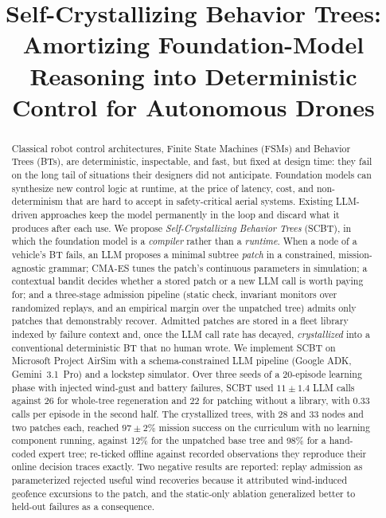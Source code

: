 \documentclass[conference]{IEEEtran}
\begin{document}
\title{Self-Crystallizing Behavior Trees: Amortizing Foundation-Model Reasoning into Deterministic Control for Autonomous Drones}

\author{}

\maketitle
\thispagestyle{plain}
\pagestyle{plain}

\begin{abstract}
Classical robot control architectures, Finite State Machines (FSMs) and Behavior Trees (BTs), are deterministic, inspectable, and fast, but fixed at design time: they fail on the long tail of situations their designers did not anticipate. Foundation models can synthesize new control logic at runtime, at the price of latency, cost, and non-determinism that are hard to accept in safety-critical aerial systems. Existing LLM-driven approaches keep the model permanently in the loop and discard what it produces after each use. We propose \emph{Self-Crystallizing Behavior Trees} (SCBT), in which the foundation model is a \emph{compiler} rather than a \emph{runtime}. When a node of a vehicle's BT fails, an LLM proposes a minimal subtree \emph{patch} in a constrained, mission-agnostic grammar; CMA-ES tunes the patch's continuous parameters in simulation; a contextual bandit decides whether a stored patch or a new LLM call is worth paying for; and a three-stage admission pipeline (static check, invariant monitors over randomized replays, and an empirical margin over the unpatched tree) admits only patches that demonstrably recover. Admitted patches are stored in a fleet library indexed by failure context and, once the LLM call rate has decayed, \emph{crystallized} into a conventional deterministic BT that no human wrote. We implement SCBT on Microsoft Project AirSim with a schema-constrained LLM pipeline (Google ADK, Gemini~3.1~Pro) and a lockstep simulator. Over three seeds of a 20-episode learning phase with injected wind-gust and battery failures, SCBT used $11\pm1.4$ LLM calls against 26 for whole-tree regeneration and 22 for patching without a library, with 0.33 calls per episode in the second half. The crystallized trees, with 28 and 33 nodes and two patches each, reached $97\pm2\%$ mission success on the curriculum with no learning component running, against 12\% for the unpatched base tree and 98\% for a hand-coded expert tree; re-ticked offline against recorded observations they reproduce their online decision traces exactly. Two negative results are reported: replay admission as parameterized rejected useful wind recoveries because it attributed wind-induced geofence excursions to the patch, and the static-only ablation generalized better to held-out failures as a consequence.
\end{abstract}
\end{document}
